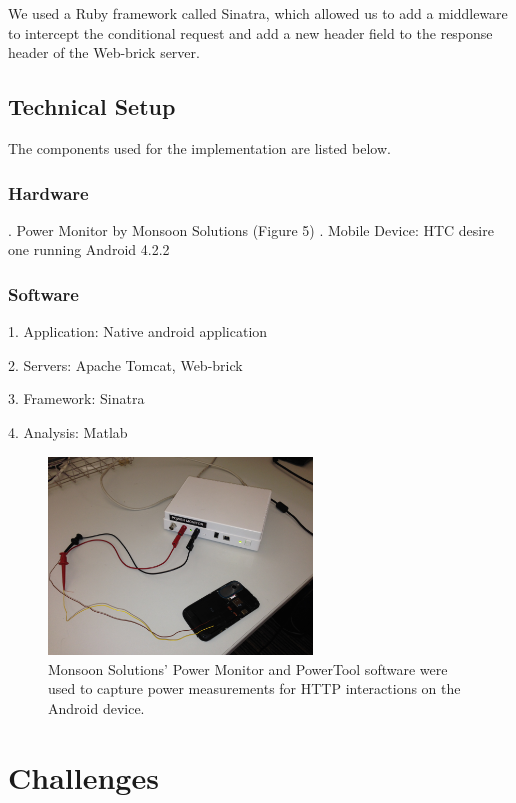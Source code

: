 \documentclass{sigplanconf}
\begin{document}
We used a Ruby framework called Sinatra, which allowed us to add a middleware to intercept the conditional request and add a new header field to the response header of the Web-brick server.

\subsection{Technical Setup}
The components used for the implementation are listed below.

\subsubsection{Hardware}

. Power Monitor by Monsoon Solutions (Figure 5) . Mobile Device: HTC desire one running Android 4.2.2

\subsubsection{Software}

1. Application: Native android application

2. Servers: Apache Tomcat, Web-brick

3. Framework: Sinatra

4. Analysis: Matlab

\begin{figure}[ht!]
\centering
\includegraphics[width=70mm]{monitor.jpg}
\caption{Monsoon Solutions’ Power Monitor and PowerTool software were used to capture power measurements for HTTP interactions on the Android device.}
\label{fig:sp_gd_mnist}
\end{figure}

\section{ Challenges}
\end{document}
